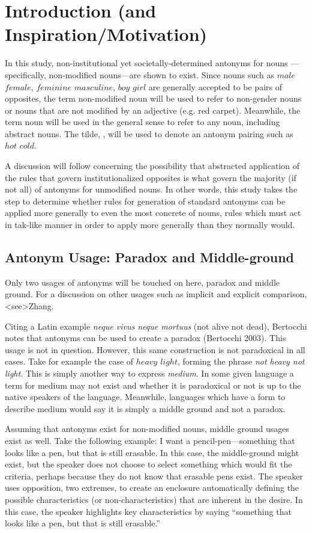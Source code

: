 \section {Introduction (and Inspiration/Motivation)}
In this study, non-institutional yet societally-determined antonyms for nouns —specifically, non-modified nouns—are shown to exist.  Since nouns such as $male$ \opp $female$, $feminine$ \opp $masculine$, $boy$ \opp $girl$ are generally accepted to be pairs of opposites, the term non-modified noun will be used to refer to non-gender nouns or nouns that are not modified by an adjective (e.g. red carpet).  Meanwhile, the term noun will be used in the general sense to refer to any noun, including abstract nouns.  The tilde, \oppnospace, will be used to denote an antonym pairing such as $hot$ \opp $cold$.  

A discussion will follow concerning the possibility that abstracted application of the rules that govern institutionalized opposites is what govern the majority (if not all) of antonyms for unmodified nouns.  In other words, this study takes the step to determine whether rules for generation of standard antonyms can be applied more generally to even the most concrete of nouns, rules which must act in tak-like manner in order to apply more generally than they normally would.

\subsection {Antonym Usage: Paradox and Middle-ground} Only two usages of antonyms will be touched on here, paradox and middle ground.  For a discussion on other usages such as implicit and explicit comparison, \citeA<see>{Zhang}.  

Citing a Latin example \textit{neque vivus neque mortuus} (not alive not dead), Bertocchi notes that antonyms can be used to create a paradox (Bertocchi 2003).  This usage is not in question.  However, this same construction is not paradoxical in all cases.  Take for example the case of $heavy$ \opp $light$, forming the phrase \textit{not heavy not light}.  This is simply another way to express \textit{medium}.  In some given language a term for medium may not exist and whether it is paradoxical or not is up to the native speakers of the language.  Meanwhile, languages which have a form to describe medium would say it is simply a middle ground and not a paradox. 

Assuming that antonyms exist for non-modified nouns, middle ground usages exist as well.  Take the following example: I want a pencil-pen---something that looks like a pen, but that is still erasable.  In this case, the middle-ground might exist, but the speaker does not choose to select something which would fit the criteria, perhaps because they do not know that erasable pens exist.  The speaker uses opposition, two extremes, to create an enclosure automatically defining the possible characteristics (or non-characteristics) that are inherent in the desire.  In this case, the speaker highlights key characteristics by saying ``something that looks like a pen, but that is still erasable.''

